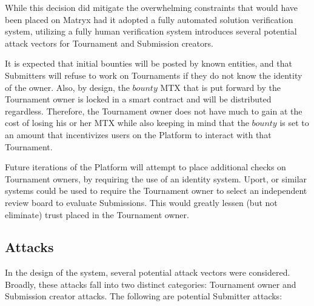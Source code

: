 \documentclass[a4paper, 10pt, conference]{ieeeconf}      %
\begin{document}
While this decision did mitigate the overwhelming constraints that would have been placed on Matryx had it adopted a fully automated solution verification system, utilizing a fully human verification system introduces several potential attack vectors for Tournament and Submission creators.

It is expected that initial bounties will be posted by known entities, and that Submitters will refuse to work on Tournaments if they do not know the identity of the owner.
Also, by design, the $bounty$ MTX that is put forward by the Tournament owner is locked in a smart contract and will be distributed regardless.
Therefore, the Tournament owner does not have much to gain at the cost of losing his or her MTX while also keeping in mind that the $bounty$ is set to an amount that incentivizes users on the Platform to interact with that Tournament.

Future iterations of the Platform will attempt to place additional checks on Tournament owners, by requiring the use of an identity system. 
Uport\cite{heck2016}, or similar systems could be used to require the Tournament owner to select an independent review board to evaluate Submissions. 
This would greatly lessen (but not eliminate) trust placed in the Tournament owner. 

\subsection{Attacks}\label{attacks}
In the design of the system, several potential attack vectors were considered. Broadly, these attacks fall into two distinct categories:  Tournament owner and Submission creator attacks. The following are potential Submitter attacks:
\end{document}
